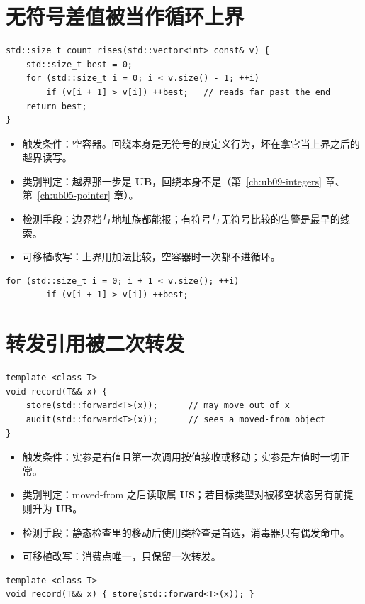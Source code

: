 \documentclass[12pt,a4paper,fontset=fandol]{ctexbook}
\newcommand{\UB}{\textbf{\textsf{UB}}}
\newcommand{\USB}{\textbf{\textsf{US}}}
\begin{document}
\section{无符号差值被当作循环上界}
\begin{lstlisting}[style=cppstyle, caption={反例：长度为零时上界回绕成极大值}]
std::size_t count_rises(std::vector<int> const& v) {
    std::size_t best = 0;
    for (std::size_t i = 0; i < v.size() - 1; ++i)
        if (v[i + 1] > v[i]) ++best;   // reads far past the end
    return best;
}
\end{lstlisting}
\begin{itemize}
\item 触发条件：空容器。回绕本身是无符号的良定义行为，坏在拿它当上界之后的越界读写。
\item 类别判定：越界那一步是 \UB{}，回绕本身不是（第~\ref{ch:ub09-integers} 章、第~\ref{ch:ub05-pointer} 章）。
\item 检测手段：边界档与地址族都能报；有符号与无符号比较的告警是最早的线索。
\item 可移植改写：上界用加法比较，空容器时一次都不进循环。
\end{itemize}
\begin{lstlisting}[style=cppstyle, caption={改写：用加法比较代替减法}]
    for (std::size_t i = 0; i + 1 < v.size(); ++i)
        if (v[i + 1] > v[i]) ++best;
\end{lstlisting}

\section{转发引用被二次转发}
\begin{lstlisting}[style=cppstyle, caption={反例：同一对象被转发两次}]
template <class T>
void record(T&& x) {
    store(std::forward<T>(x));      // may move out of x
    audit(std::forward<T>(x));      // sees a moved-from object
}
\end{lstlisting}
\begin{itemize}
\item 触发条件：实参是右值且第一次调用按值接收或移动；实参是左值时一切正常。
\item 类别判定：moved-from 之后读取属 \USB{}；若目标类型对被移空状态另有前提则升为 \UB{}。
\item 检测手段：静态检查里的移动后使用类检查是首选，消毒器只有偶发命中。
\item 可移植改写：消费点唯一，只保留一次转发。
\end{itemize}
\begin{lstlisting}[style=cppstyle, caption={改写：一次转发一处消费}]
template <class T>
void record(T&& x) { store(std::forward<T>(x)); }
\end{lstlisting}
\end{document}
